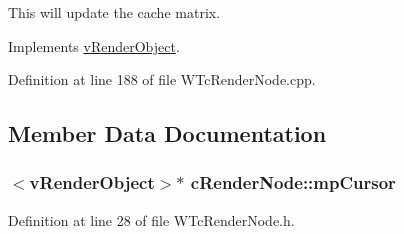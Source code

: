 This will update the cache matrix. 



Implements \hyperlink{classv_render_object_a18c1f3fcab0c4c28358e539a5ec57ad3}{vRenderObject}.



Definition at line 188 of file WTcRenderNode.cpp.



\subsection{Member Data Documentation}
\hypertarget{classc_render_node_a753eafd93821f67b86ee8f4642053f2d}{
\subsubsection[{mpCursor}]{$<${\bf vRenderObject}$>$$\ast$ {\bf cRenderNode::mpCursor}}}
\label{classc_render_node_a753eafd93821f67b86ee8f4642053f2d}


Definition at line 28 of file WTcRenderNode.h.

